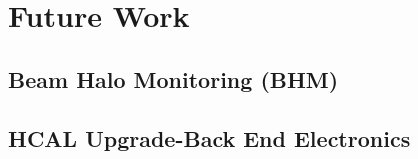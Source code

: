 \chapter{Future Work}
\label{Future_Work_Chapter}

\section{Beam Halo Monitoring (BHM)}
\label{Beam Halo Procedure}


\section{HCAL Upgrade-Back End Electronics}
\label{hcal)back_end_Electronics}

